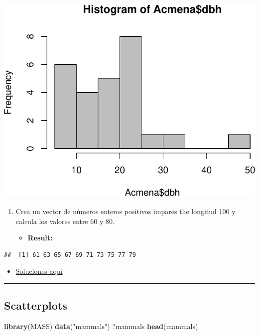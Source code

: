 \documentclass[]{article}
\def\tightlist{}
\newenvironment{Shaded}{\begin{snugshade}}{\end{snugshade}}
\newcommand{\KeywordTok}[1]{\textcolor[rgb]{0.13,0.29,0.53}{\textbf{{#1}}}}
\newcommand{\StringTok}[1]{\textcolor[rgb]{0.31,0.60,0.02}{{#1}}}
\newcommand{\NormalTok}[1]{{#1}}
\numberwithin{equation}{section}
\begin{document}
\includegraphics{tema1_files/figure-latex/unnamed-chunk-74-1.pdf}

\begin{enumerate}
\def\labelenumi{\arabic{enumi}.}
\setcounter{enumi}{3}
\item
  Crea un vector de números enteros positivos impares the longitud 100 y
  calcula los valores entre 60 y 80.

  \begin{itemize}
  \tightlist
  \item
    \textbf{Result:}
  \end{itemize}
\end{enumerate}

\begin{verbatim}
##  [1] 61 63 65 67 69 71 73 75 77 79
\end{verbatim}

\begin{itemize}
\tightlist
\item
  \href{http://idaejin.github.io/bcam-courses/rbasics/rbasics_sol.R}{Soluciones
  aquí}
\end{itemize}

\begin{center}\rule{0.5\linewidth}{\linethickness}\end{center}

\subsection{Scatterplots}\label{scatterplots}

\begin{Shaded}
\begin{Highlighting}[]
\KeywordTok{library}\NormalTok{(MASS)}
\KeywordTok{data}\NormalTok{(}\StringTok{"mammals"}\NormalTok{)}
\NormalTok{?mammals}
\KeywordTok{head}\NormalTok{(mammals)}
\end{Highlighting}
\end{Shaded}
\end{document}
